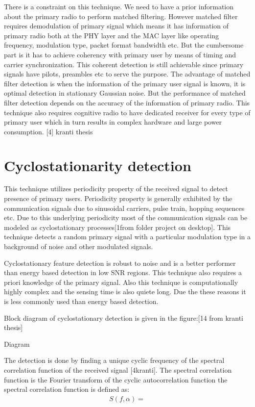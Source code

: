 There is a constraint on this technique. We need to have a prior information 
about the primary radio to perform matched filtering. However matched filter 
requires demodulation of primary signal which means it has information of 
primary radio both at the PHY layer and the MAC layer like operating frequency, 
modulation type, packet format bandwidth etc. But the cumbersome part is it has 
to achieve coherency with primary user by means of timing and carrier 
synchronization. This coherent detection is still achievable since primary 
signals have pilots, preambles etc to serve the purpose. 
The advantage of matched filter detection is when the information of the primary
user signal is known, it is optimal detection in stationary Gaussian noise. But 
the performance of matched filter detection depends on the accuracy of the 
information of primary radio. This technique also requires cognitive radio to 
have dedicated receiver for every type of primary user which in turn results in 
complex hardware and large power consumption. [4] kranti thesis

\section{Cyclostationarity detection}

This technique utilizes periodicity property of the received signal to detect 
presence of primary users. Periodicity property is generally exhibited by the 
communication signals due to sinusoidal carriers, pulse train, hopping sequences
etc. Due to this underlying periodicity most of the communication signals can be
modeled as cyclostationary processes[1from folder project on desktop]. This 
technique detects a random primary signal with a particular modulation type in a
background of noise and other modulated signals.

Cyclostationary feature detection is robust to noise and is a better performer 
than energy based detection in low SNR regions. This technique also requires a 
priori knowledge of the primary signal. Also this technique is computationally 
highly complex and the sensing time is also quiete long. Due the these reasons 
it is less commonly used than energy based detection.

Block diagram of cyclostationary detection is given in the figure:[14 from 
kranti thesis]


Diagram 

The detection is done by finding a unique cyclic frequency of the spectral 
correlation function of the received signal [4kranti]. The spectral correlation 
function is the Fourier transform of the cyclic autocorrelation function the 
spectral correlation function is defined as:
\begin{align}
                                        S(f,\alpha)=
\end{align}

